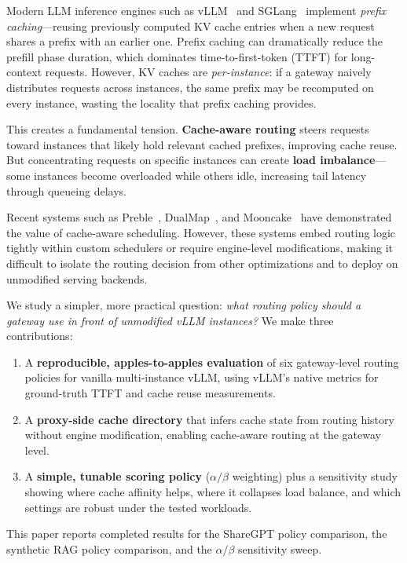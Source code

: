 \documentclass{article}
\begin{document}
Modern LLM inference engines such as vLLM~\citep{kwon2023pagedattention} and SGLang~\citep{zheng2024sglang} implement \emph{prefix caching}---reusing previously computed KV cache entries when a new request shares a prefix with an earlier one. Prefix caching can dramatically reduce the prefill phase duration, which dominates time-to-first-token (TTFT) for long-context requests. However, KV caches are \emph{per-instance}: if a gateway naively distributes requests across instances, the same prefix may be recomputed on every instance, wasting the locality that prefix caching provides.

This creates a fundamental tension. \textbf{Cache-aware routing} steers requests toward instances that likely hold relevant cached prefixes, improving cache reuse. But concentrating requests on specific instances can create \textbf{load imbalance}---some instances become overloaded while others idle, increasing tail latency through queueing delays.

Recent systems such as Preble~\citep{tao2024preble}, DualMap~\citep{zhu2025dualmap}, and Mooncake~\citep{qin2025mooncake} have demonstrated the value of cache-aware scheduling. However, these systems embed routing logic tightly within custom schedulers or require engine-level modifications, making it difficult to isolate the routing decision from other optimizations and to deploy on unmodified serving backends.

We study a simpler, more practical question: \emph{what routing policy should a gateway use in front of unmodified vLLM instances?} We make three contributions:

\begin{enumerate}
    \item A \textbf{reproducible, apples-to-apples evaluation} of six gateway-level routing policies for vanilla multi-instance vLLM, using vLLM's native metrics for ground-truth TTFT and cache reuse measurements.
    \item A \textbf{proxy-side cache directory} that infers cache state from routing history without engine modification, enabling cache-aware routing at the gateway level.
    \item A \textbf{simple, tunable scoring policy} ($\alpha/\beta$ weighting) plus a sensitivity study showing where cache affinity helps, where it collapses load balance, and which settings are robust under the tested workloads.
\end{enumerate}

This paper reports completed results for the ShareGPT policy comparison, the synthetic RAG policy comparison, and the $\alpha/\beta$ sensitivity sweep.
\end{document}
